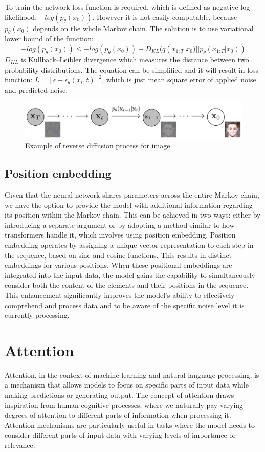 \documentclass[11pt,a4paper]{report}
\begin{document}
To train the network loss function is required, which is defined as negative \break log-likelihood: $-log(p_\theta(x_0))$. However it is not easily computable, because $p_\theta(x_0)$ depends on the whole Markov chain. The solution is to use variational lower bound of the function:
\[-log(p_\theta(x_0)) \le -log(p_\theta(x_0)) + D_{KL}(q(x_{1:T}|x_0)||p_\theta(x_{1:T}|x_0))\]
$D_{KL}$ is Kullback–Leibler divergence which measures the distance between two probability distributions. \cite{KL_divergence} The equation can be simplified \cite{ImprovedDDPM} and it will result in loss function: $L=||\epsilon - \epsilon_\theta(x_t, t)||^2$, which is just mean square error of applied noise and predicted noise. \cite{aman_diffusion}

\begin{figure}[H]
	\centering
	\includegraphics[width=\textwidth]{images/reverse-diffusion}
    \caption{Example of reverse diffusion process for image \cite{DDPM}}
\end{figure}

\subsection{Position embedding}
Given that the neural network shares parameters across the entire Markov chain, we have the option to provide the model with additional information regarding its position within the Markov chain. This can be achieved in two ways: either by introducing a separate argument or by adopting a method similar to how transformers handle it, which involves using position embedding. Position embedding operates by assigning a unique vector representation to each step in the sequence, based on sine and cosine functions. This results in distinct embeddings for various positions. When these positional embeddings are integrated into the input data, the model gains the capability to simultaneously consider both the content of the elements and their positions in the sequence. This enhancement significantly improves the model's ability to effectively comprehend and process data and to be aware of the specific noise level it is currently processing. \cite{positionEmbedding_hf} \cite{AttentionIsAll}

\section{Attention}
Attention, in the context of machine learning and natural language processing, is a mechanism that allows models to focus on specific parts of input data while making predictions or generating output. The concept of attention draws inspiration from human cognitive processes, where we naturally pay varying degrees of attention to different parts of information when processing it. Attention mechanisms are particularly useful in tasks where the model needs to consider different parts of input data with varying levels of importance or relevance. \cite{AttentionWhatIs}
\end{document}
